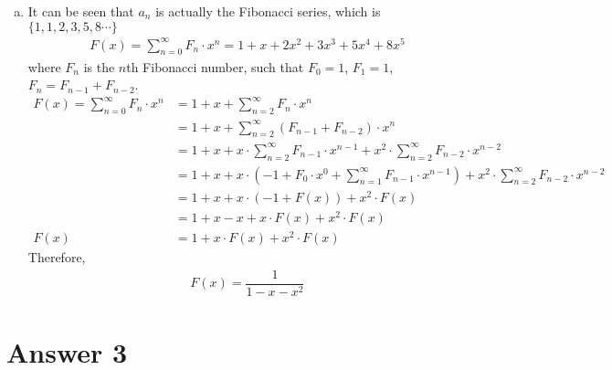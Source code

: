 \documentclass[12pt]{article}
\begin{document}
\begin{enumerate}[a)]
        \item It can be seen that $a_n$ is actually the Fibonacci series, which is $\{1, 1, 2, 3, 5, 8 \cdots\}$
            \begin{align*}
                F(x) = \sum^{\infty}_{n=0} F_n \cdot x^n = 1 + x + 2x^2 + 3x^3 + 5x^4 + 8x^5
            \end{align*}
            where $F_n$ is the $n$th Fibonacci number, such that $F_0 = 1$, $F_1 = 1$, $F_n = F_{n-1} + F_{n-2}$.
            \begin{align*}
                F(x) = \sum^{\infty}_{n=0} F_n \cdot x^n &= 1 + x + \sum^{\infty}_{n=2} F_n \cdot x^n \\
                &= 1 + x + \sum^{\infty}_{n=2} (F_{n-1} + F_{n-2}) \cdot x^n \\
                &= 1 + x + x \cdot \sum^{\infty}_{n=2} F_{n-1} \cdot x^{n-1} + x^2 \cdot \sum^{\infty}_{n=2} F_{n-2} \cdot x^{n-2} \\
                &= 1 + x + x \cdot (-1 + F_0 \cdot x^0 + \sum^{\infty}_{n=1} F_{n-1} \cdot x^{n-1}) + x^2 \cdot \sum^{\infty}_{n=2} F_{n-2} \cdot x^{n-2} \\
                &= 1 + x + x \cdot (-1 + F(x)) + x^2 \cdot F(x) \\
                &= 1 + x - x + x \cdot F(x) + x^2 \cdot F(x) \\
                F(x) &= 1 + x \cdot F(x) + x^2 \cdot F(x)
            \end{align*}
            Therefore,
            \begin{align*}
                F(x) = \dfrac{1}{1 - x - x^2}
            \end{align*}
            
    \end{enumerate}{}

\pagebreak{}

\section*{Answer 3}
    
\end{document}
